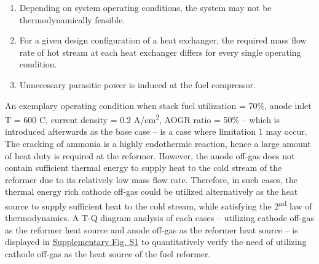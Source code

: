 \documentclass[a4paper,10pt]{cas-dc} %
\begin{document}
\begin{enumerate}
\def\labelenumi{\arabic{enumi}.}
\item Depending on system operating conditions, the system may not be thermodynamically feasible.
\item For a given design configuration of a heat exchanger, the required mass flow rate of hot stream at each heat exchanger differs for every single operating condition.
\item Unnecessary parasitic power is induced at the fuel compressor.
\end{enumerate}

An exemplary operating condition when stack fuel utilization = 70\%, anode inlet T = 600 \textdegree C, current density = 0.2 A/cm\textsuperscript{2}, AOGR ratio = 50\% -- which is introduced afterwards as the base case -- is a case where limitation 1 may occur.
The cracking of ammonia is a highly endothermic reaction, hence a large amount of heat duty is required at the reformer.
However, the anode off-gas does not contain sufficient thermal energy to supply heat to the cold stream of the reformer due to its relatively low mass flow rate.
Therefore, in such cases, the thermal energy rich cathode off-gas could be utilized alternatively as the heat source to supply sufficient heat to the cold stream, while satisfying the 2\textsuperscript{nd} law of thermodynamics.
A T-Q diagram analysis of each cases -- utilizing cathode off-gas as the reformer heat source and anode off-gas as the reformer heat source -- is displayed in \href{Supplementary.pdf}{Supplementary Fig. S1} to quantitatively verify the need of utilizing cathode off-gas as the heat source of the fuel reformer.
\end{document}
